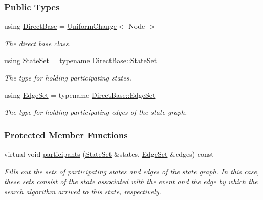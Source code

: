 \subsubsection*{Public Types}
\begin{DoxyCompactItemize}
\item 
using \hyperlink{structevent_1_1VertexEdgeChange_a67879d3d04d07a00309953b96a5f44f6}{Direct\+Base} = \hyperlink{structevent_1_1UniformChange}{Uniform\+Change}$<$ Node $>$\hypertarget{structevent_1_1VertexEdgeChange_a67879d3d04d07a00309953b96a5f44f6}{}\label{structevent_1_1VertexEdgeChange_a67879d3d04d07a00309953b96a5f44f6}

\begin{DoxyCompactList}\small\item\em The direct base class. \end{DoxyCompactList}\item 
using \hyperlink{structevent_1_1VertexEdgeChange_afde51ce1f7c2d27e5111f20a0e51b165}{State\+Set} = typename \hyperlink{structevent_1_1UniformChange_a71997f4cc920d6c5c65fab2049d5e42d}{Direct\+Base\+::\+State\+Set}\hypertarget{structevent_1_1VertexEdgeChange_afde51ce1f7c2d27e5111f20a0e51b165}{}\label{structevent_1_1VertexEdgeChange_afde51ce1f7c2d27e5111f20a0e51b165}

\begin{DoxyCompactList}\small\item\em The type for holding participating states. \end{DoxyCompactList}\item 
using \hyperlink{structevent_1_1VertexEdgeChange_af735a587c2c22feda933aeedc6285077}{Edge\+Set} = typename \hyperlink{structevent_1_1UniformChange_a01841b7c7ff05760a96c8b239f82a29c}{Direct\+Base\+::\+Edge\+Set}\hypertarget{structevent_1_1VertexEdgeChange_af735a587c2c22feda933aeedc6285077}{}\label{structevent_1_1VertexEdgeChange_af735a587c2c22feda933aeedc6285077}

\begin{DoxyCompactList}\small\item\em The type for holding participating edges of the state graph. \end{DoxyCompactList}\end{DoxyCompactItemize}
\subsubsection*{Protected Member Functions}
\begin{DoxyCompactItemize}
\item 
virtual void \hyperlink{structevent_1_1VertexEdgeChange_acda5aae1ff3f510c1fffbf57db1cb920}{participants} (\hyperlink{structevent_1_1UniformChange_a71997f4cc920d6c5c65fab2049d5e42d}{State\+Set} \&states, \hyperlink{structevent_1_1UniformChange_a01841b7c7ff05760a96c8b239f82a29c}{Edge\+Set} \&edges) const 
\begin{DoxyCompactList}\small\item\em Fills out the sets of participating states and edges of the state graph. In this case, these sets consist of the state associated with the event and the edge by which the search algorithm arrived to this state, respectively. \end{DoxyCompactList}\end{DoxyCompactItemize}
